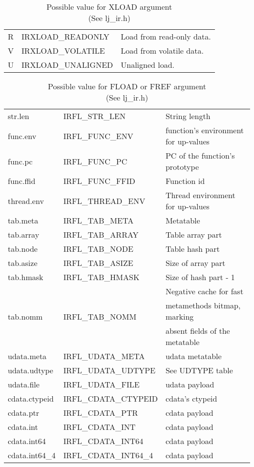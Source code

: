 \begin{table}[H]
\centering
\caption{
  Possible value for XLOAD argument \\(See lj\_ir.h)
}
\label{tab:dump-xload}
\begin{tabular}{|l|l|l|}
\hline
R & IRXLOAD\_READONLY  & Load from read-only data.\\
V & IRXLOAD\_VOLATILE  & Load from volatile data.\\
U & IRXLOAD\_UNALIGNED & Unaligned load.\\
\hline
\end{tabular}
\end{table}

\begin{table}[H]
\centering
\caption{
  Possible value for FLOAD or FREF argument \\(See lj\_ir.h)
}
\label{tab:dump-fload-fref}
\begin{tabular}{|l|l|l|}
\hline
str.len        & IRFL\_STR\_LEN        & String length \\
func.env       & IRFL\_FUNC\_ENV       & function's environment for up-values \\
func.pc        & IRFL\_FUNC\_PC        & PC of the function's prototype \\
func.ffid      & IRFL\_FUNC\_FFID      & Function id \\
thread.env     & IRFL\_THREAD\_ENV     & Thread environment for up-values \\
tab.meta       & IRFL\_TAB\_META       & Metatable \\
tab.array      & IRFL\_TAB\_ARRAY      & Table array part \\
tab.node       & IRFL\_TAB\_NODE       & Table hash part \\
tab.asize      & IRFL\_TAB\_ASIZE      & Size of array part\\
tab.hmask      & IRFL\_TAB\_HMASK      & Size of hash part - 1\\\hline
\multirow{3}{*}{tab.nomm} & \multirow{3}{*}{IRFL\_TAB\_NOMM} & Negative cache for fast \\
& & metamethods bitmap, marking\\
& & absent fields of the metatable\\\hline
udata.meta     & IRFL\_UDATA\_META     & udata metatable\\
udata.udtype   & IRFL\_UDATA\_UDTYPE   & See UDTYPE table\\
udata.file     & IRFL\_UDATA\_FILE     & udata payload \\
cdata.ctypeid  & IRFL\_CDATA\_CTYPEID  & cdata's ctypeid\\
cdata.ptr      & IRFL\_CDATA\_PTR      & cdata payload \\
cdata.int      & IRFL\_CDATA\_INT      & cdata payload \\
cdata.int64    & IRFL\_CDATA\_INT64    & cdata payload \\
cdata.int64\_4 & IRFL\_CDATA\_INT64\_4 & cdata payload \\
\hline
\end{tabular}
\end{table}


